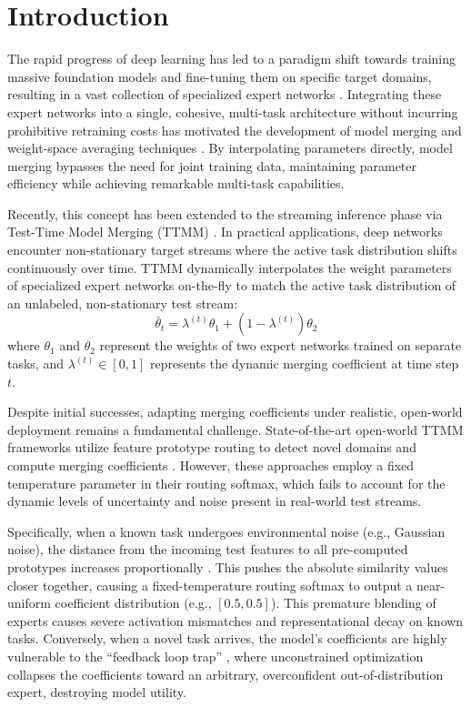 \documentclass{article}
\theoremstyle{plain}
\theoremstyle{definition}
\theoremstyle{remark}
\begin{document}
\section{Introduction}
\label{sec:intro}

The rapid progress of deep learning has led to a paradigm shift towards training massive foundation models and fine-tuning them on specific target domains, resulting in a vast collection of specialized expert networks \cite{wortsman2022soups, radford2021learning}. Integrating these expert networks into a single, cohesive, multi-task architecture without incurring prohibitive retraining costs has motivated the development of model merging and weight-space averaging techniques \cite{ilharco2023editing, matena2022merging, ainsworth2023git}. By interpolating parameters directly, model merging bypasses the need for joint training data, maintaining parameter efficiency while achieving remarkable multi-task capabilities.

Recently, this concept has been extended to the streaming inference phase via Test-Time Model Merging (TTMM) \cite{yang2024test, hubotter2025fisher}. In practical applications, deep networks encounter non-stationary target streams where the active task distribution shifts continuously over time. TTMM dynamically interpolates the weight parameters of specialized expert networks on-the-fly to match the active task distribution of an unlabeled, non-stationary test stream:
\begin{equation}
  \bar{\theta}_t = \lambda^{(t)} \theta_1 + (1 - \lambda^{(t)}) \theta_2
\end{equation}
where $\theta_1$ and $\theta_2$ represent the weights of two expert networks trained on separate tasks, and $\lambda^{(t)} \in [0, 1]$ represents the dynamic merging coefficient at time step $t$.

Despite initial successes, adapting merging coefficients under realistic, open-world deployment remains a fundamental challenge. State-of-the-art open-world TTMM frameworks utilize feature prototype routing to detect novel domains and compute merging coefficients \cite{anonymous2026iggsow, anonymous2026fpow}. However, these approaches employ a fixed temperature parameter in their routing softmax, which fails to account for the dynamic levels of uncertainty and noise present in real-world test streams. 

Specifically, when a known task undergoes environmental noise (e.g., Gaussian noise), the distance from the incoming test features to all pre-computed prototypes increases proportionally \cite{hendrycks2019benchmarking}. This pushes the absolute similarity values closer together, causing a fixed-temperature routing softmax to output a near-uniform coefficient distribution (e.g., $[0.5, 0.5]$). This premature blending of experts causes severe activation mismatches and representational decay on known tasks. Conversely, when a novel task arrives, the model's coefficients are highly vulnerable to the ``feedback loop trap'' \cite{anonymous2026iggsow}, where unconstrained optimization collapses the coefficients toward an arbitrary, overconfident out-of-distribution expert, destroying model utility.
\end{document}
